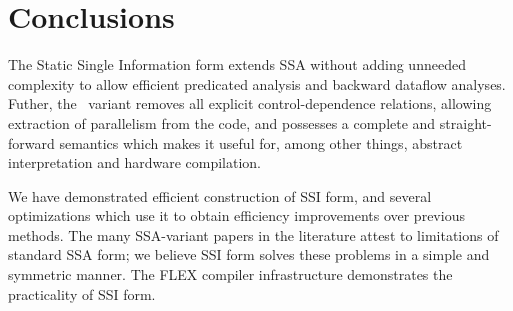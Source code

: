 \documentclass[12pt,titlepage,twoside]{article}
\let\oldsection\section
\renewcommand{\section}{\setcounter{figure}{0}\setcounter{table}{0}\oldsection}
\begin{document}
\section{Conclusions}
The Static Single Information form extends SSA without adding unneeded
complexity to allow efficient predicated analysis and backward
dataflow analyses.  Futher, the \ssiplus\ variant removes all explicit
control-dependence relations, allowing extraction of parallelism from
the code, and possesses a complete and straight-forward semantics
which makes it useful for, among other things, abstract interpretation
and hardware compilation.

We have demonstrated efficient construction of SSI form, and several
optimizations which use it to obtain efficiency improvements over
previous methods.  The many SSA-variant papers in the literature
attest to limitations of standard SSA form; we believe SSI form solves
these problems in a simple and symmetric manner.  The FLEX
compiler infrastructure demonstrates the practicality
of SSI form.
\end{document}
